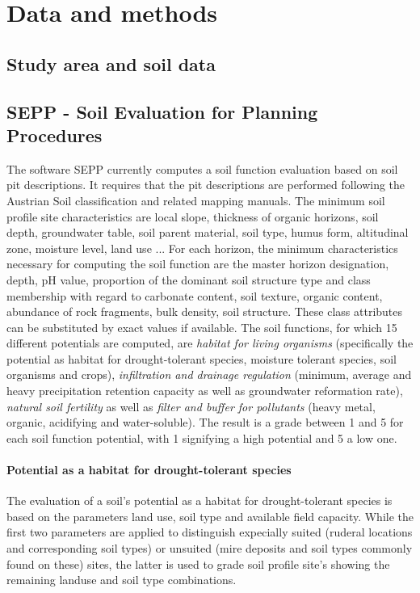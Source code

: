 \documentclass[preprint,12pt,authoryear]{elsarticle}
\begin{document}
\section{Data and methods}

\subsection{Study area and soil data}

\subsection{SEPP - Soil Evaluation for Planning Procedures}
The software SEPP currently computes a soil function evaluation based on soil pit descriptions. It requires that the pit descriptions are performed following the Austrian Soil classification  \citep{Nestroy2000,Nestroy2011} and related mapping manuals. The minimum  soil profile site characteristics are local slope, thickness of organic horizons, soil depth, groundwater table, soil parent material, soil type, humus form, altitudinal zone, moisture level, land use ... For each horizon, the minimum characteristics necessary for computing the soil function are the master horizon designation, depth, pH value, proportion of the dominant soil structure type and class membership with regard to carbonate content, soil texture, organic content, abundance of rock fragments, bulk density, soil structure. These class attributes can be substituted by exact values if available. The soil functions, for which 15 different potentials are computed, are  \emph{habitat for living organisms} (specifically the potential as habitat for drought-tolerant species, moisture tolerant species, soil organisms and crops),  \emph{infiltration and drainage regulation} (minimum, average and heavy precipitation retention capacity as well as groundwater reformation rate), \emph{natural soil fertility} as well as \emph{filter and buffer for pollutants} (heavy metal, organic, acidifying and water-soluble). The result is a grade between 1 and 5 for each soil function potential, with 1 signifying a high potential and 5 a low one.

\paragraph{Potential as a habitat for drought-tolerant species}
The evaluation of a soil's potential  as a habitat for drought-tolerant species is based on the parameters land use, soil type and available field capacity. While the first two parameters are applied to distinguish expecially suited (ruderal locations and corresponding soil types) or unsuited (mire deposits and soil types commonly found on these) sites, the latter is used to grade soil profile site's showing the remaining landuse and soil type combinations.
\end{document}
